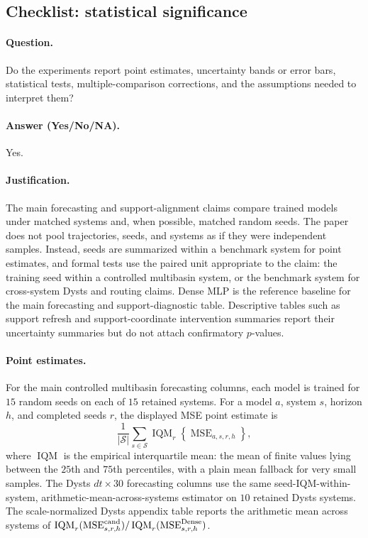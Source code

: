 \subsection{Checklist: statistical significance}
\label{app:checklist_statistical_significance}

\paragraph{Question.}
Do the experiments report point estimates, uncertainty bands or error bars, statistical tests, multiple-comparison corrections, and the assumptions needed to interpret them?

\paragraph{Answer (Yes/No/NA).}
Yes.

\paragraph{Justification.}
The main forecasting and support-alignment claims compare trained models under matched systems and, when possible, matched random seeds. The paper does not pool trajectories, seeds, and systems as if they were independent samples. Instead, seeds are summarized within a benchmark system for point estimates, and formal tests use the paired unit appropriate to the claim: the training seed within a controlled multibasin system, or the benchmark system for cross-system Dysts and routing claims. Dense MLP is the reference baseline for the main forecasting and support-diagnostic table. Descriptive tables such as support refresh and support-coordinate intervention summaries report their uncertainty summaries but do not attach confirmatory \(p\)-values.

\paragraph{Point estimates.}
For the main controlled multibasin forecasting columns, each model is trained for \(15\) random seeds on each of \(15\) retained systems. For a model \(a\), system \(s\), horizon \(h\), and completed seeds \(r\), the displayed MSE point estimate is
\[
  \frac{1}{|\mathcal S|}
  \sum_{s\in\mathcal S}
  \operatorname{IQM}_{r}\!\left\{\operatorname{MSE}_{a,s,r,h}\right\},
\]
where \(\operatorname{IQM}\) is the empirical interquartile mean: the mean of finite values lying between the \(25\)th and \(75\)th percentiles, with a plain mean fallback for very small samples. The Dysts \(dt{\times}30\) forecasting columns use the same seed-IQM-within-system, arithmetic-mean-across-systems estimator on \(10\) retained Dysts systems. The scale-normalized Dysts appendix table reports the arithmetic mean across systems of \(\operatorname{IQM}_{r}(\operatorname{MSE}^{\rm cand}_{s,r,h}) / \operatorname{IQM}_{r}(\operatorname{MSE}^{\rm Dense}_{s,r,h})\).

